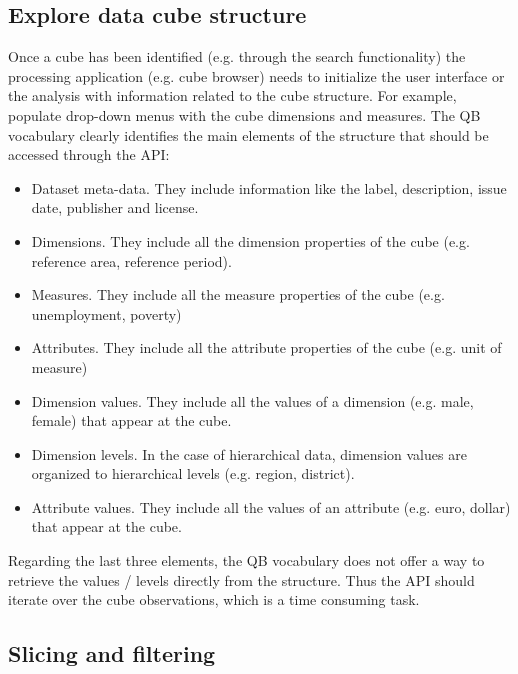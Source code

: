 \documentclass{llncs}
\begin{document}
\subsection{Explore data cube structure}

Once a cube has been identified (e.g. through the search functionality) the processing application (e.g. cube browser) needs to initialize the user interface or the analysis with information related to the cube structure. For example, populate drop-down menus with the cube dimensions and measures. The QB vocabulary clearly identifies the main elements of the structure that should be accessed through the API:
\begin{itemize}
\item Dataset meta-data. They include information like the label, description, issue date, publisher and license.
\item Dimensions. They include all the dimension properties of the cube (e.g. reference area, reference period).
\item Measures. They include all the measure properties of the cube (e.g. unemployment, poverty)
\item Attributes. They include all the attribute properties of the cube (e.g. unit of measure)
\item Dimension values. They include all the values of a dimension (e.g. male, female) that appear at the cube. 
\item Dimension levels. In the case of hierarchical data, dimension values are organized to hierarchical levels (e.g. region, district).
\item Attribute values. They include all the values of an attribute (e.g. euro, dollar) that appear at the cube. 
\end{itemize} 

Regarding the last three elements, the QB vocabulary does not offer a way to retrieve the values / levels directly from the structure. Thus the API should iterate over the cube observations, which is a time consuming task.

\subsection{Slicing and filtering}\label{sec:slice}
\end{document}
